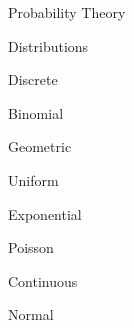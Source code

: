 \documentclass[11pt]{article}
\begin{document}
\begin{enumerate}
\begin{item}
\begin{enumerate}
          \begin{item}
            Probability Theory
          \end{item}

          \begin{item}

            Distributions

            \begin{enumerate}

                \begin{item}

                  Discrete

                  \begin{enumerate}

                      \begin{item}
                        Binomial
                      \end{item}

                      \begin{item}
                        Geometric
                      \end{item}

                      \begin{item}
                        Uniform
                      \end{item}

                      \begin{item}
                        Exponential
                      \end{item}

                      \begin{item}
                        Poisson
                      \end{item}

                  \end{enumerate}

                \end{item}

                \begin{item}

                  Continuous

                  \begin{enumerate}

                      \begin{item}
                        Normal
                      \end{item}


\end{enumerate}
\end{item}
\end{enumerate}
\end{item}
\end{enumerate}
\end{item}
\end{enumerate}
\end{document}
